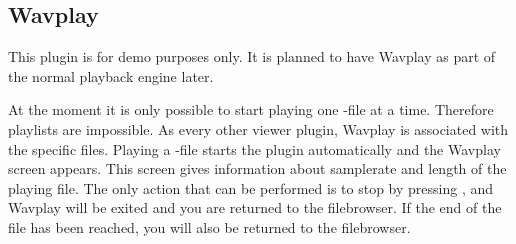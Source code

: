 \subsection{Wavplay}
This plugin is for demo purposes only. It is planned to have 
Wavplay as part of the normal playback engine later.

At the moment it is only possible to start playing one -file at a 
time. Therefore playlists are impossible. As every other viewer plugin, Wavplay
is associated with the specific files. Playing a -file starts the 
plugin automatically and the Wavplay screen 
appears. This screen gives information about samplerate and length of the 
playing file. 
The only action that can be performed is to stop by pressing \ButtonOff, and 
Wavplay will be exited and you are returned to the  filebrowser. If the end of 
the file has been reached, you will also be returned to the filebrowser.
